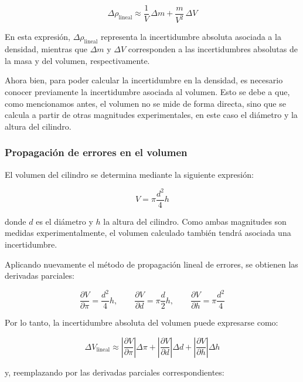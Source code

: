 \begin{equation}
\Delta \rho_{\text{lineal}} \approx
\frac{1}{V}\,\Delta m
+
\frac{m}{V^2}\,\Delta V
\end{equation}

En esta expresión, $\Delta \rho_{\text{lineal}}$ representa la incertidumbre absoluta asociada a la densidad, mientras que $\Delta m$ y $\Delta V$ corresponden a las incertidumbres absolutas de la masa y del volumen, respectivamente.

Ahora bien, para poder calcular la incertidumbre en la densidad, es necesario conocer previamente la incertidumbre asociada al volumen. Esto se debe a que, como mencionamos antes, el volumen no se mide de forma directa, sino que se calcula a partir de otras magnitudes experimentales, en este caso el diámetro y la altura del cilindro.

\subsubsection{Propagación de errores en el volumen}

El volumen del cilindro se determina mediante la siguiente expresión:

\begin{equation}
V = \pi \frac{d^2}{4} h
\end{equation}

donde $d$ es el diámetro y $h$ la altura del cilindro. Como ambas magnitudes son medidas experimentalmente, el volumen calculado también tendrá asociada una incertidumbre.

Aplicando nuevamente el método de propagación lineal de errores, se obtienen las derivadas parciales:

\begin{equation}
\frac{\partial V}{\partial \pi} = \frac{d^2}{4}h,
\qquad
\frac{\partial V}{\partial d} = \pi \frac{d}{2}h,
\qquad
\frac{\partial V}{\partial h} = \pi \frac{d^2}{4}
\end{equation}

Por lo tanto, la incertidumbre absoluta del volumen puede expresarse como:

\begin{equation}
\Delta V_{\text{lineal}} \approx 
\left| \frac{\partial V}{\partial \pi} \right| \Delta \pi
+
\left| \frac{\partial V}{\partial d} \right| \Delta d
+
\left| \frac{\partial V}{\partial h} \right| \Delta h
\end{equation}

y, reemplazando por las derivadas parciales correspondientes:

